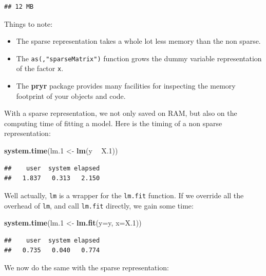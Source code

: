 \documentclass[]{book}
\newenvironment{Shaded}{\begin{snugshade}}{\end{snugshade}}
\newcommand{\KeywordTok}[1]{\textcolor[rgb]{0.13,0.29,0.53}{\textbf{#1}}}
\newcommand{\DataTypeTok}[1]{\textcolor[rgb]{0.13,0.29,0.53}{#1}}
\newcommand{\DecValTok}[1]{\textcolor[rgb]{0.00,0.00,0.81}{#1}}
\newcommand{\StringTok}[1]{\textcolor[rgb]{0.31,0.60,0.02}{#1}}
\newcommand{\OperatorTok}[1]{\textcolor[rgb]{0.81,0.36,0.00}{\textbf{#1}}}
\newcommand{\NormalTok}[1]{#1}
\providecommand{\tightlist}{%
  \setlength{\itemsep}{0pt}\setlength{\parskip}{0pt}}
\theoremstyle{definition}
\theoremstyle{definition}
\theoremstyle{definition}
\theoremstyle{remark}
\begin{document}
\begin{verbatim}
## 12 MB
\end{verbatim}

Things to note:

\begin{itemize}
\tightlist
\item
  The sparse representation takes a whole lot less memory than the non
  sparse.
\item
  The \texttt{as(,"sparseMatrix")} function grows the dummy variable
  representation of the factor \texttt{x}.
\item
  The \textbf{pryr} package provides many facilities for inspecting the
  memory footprint of your objects and code.
\end{itemize}

With a sparse representation, we not only saved on RAM, but also on the
computing time of fitting a model. Here is the timing of a non sparse
representation:

\begin{Shaded}
\begin{Highlighting}[]
\KeywordTok{system.time}\NormalTok{(lm.}\DecValTok{1}\NormalTok{ <-}\StringTok{ }\KeywordTok{lm}\NormalTok{(y }\OperatorTok{~}\StringTok{ }\NormalTok{X.}\DecValTok{1}\NormalTok{)) }
\end{Highlighting}
\end{Shaded}

\begin{verbatim}
##    user  system elapsed 
##   1.837   0.313   2.150
\end{verbatim}

Well actually, \texttt{lm} is a wrapper for the \texttt{lm.fit}
function. If we override all the overhead of \texttt{lm}, and call
\texttt{lm.fit} directly, we gain some time:

\begin{Shaded}
\begin{Highlighting}[]
\KeywordTok{system.time}\NormalTok{(lm.}\DecValTok{1}\NormalTok{ <-}\StringTok{ }\KeywordTok{lm.fit}\NormalTok{(}\DataTypeTok{y=}\NormalTok{y, }\DataTypeTok{x=}\NormalTok{X.}\DecValTok{1}\NormalTok{))}
\end{Highlighting}
\end{Shaded}

\begin{verbatim}
##    user  system elapsed 
##   0.735   0.040   0.774
\end{verbatim}

We now do the same with the sparse representation:
\end{document}
